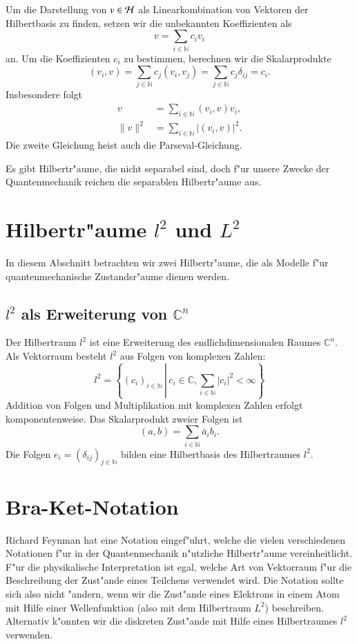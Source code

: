 Um die Darstellung von $v\in\cal H$ als Linearkombination von Vektoren
der Hilbertbasis zu finden, setzen wir die unbekannten Koeffizienten
als 
\[
v=\sum_{i\in\mathbb N}c_iv_i
\]
an. Um die Koeffizienten $c_i$ zu bestimmen, berechnen wir die
Skalarprodukte
\[
(v_i,v)
=\sum_{j\in\mathbb N} c_j(v_i,v_j)=\sum_{j\in\mathbb N}c_j\delta_{ij}=c_i.
\]
Insbesondere folgt
\begin{align*}
v&=\sum_{i\in\mathbb N}(v_i,v) v_i,\\
\| v\|^2&=\sum_{i\in\mathbb N} |(v_i,v)|^2.
\end{align*}
Die zweite Gleichung heist auch die Parseval-Gleichung.

Es gibt Hilbertr"aume, die nicht separabel sind, doch f"ur unsere Zwecke
der Quantenmechanik reichen die separablen Hilbertr"aume aus.

\section{Hilbertr"aume $l^2$ und $L^2$}
In diesem Abschnitt betrachten wir zwei Hilbertr"aume, die als 
Modelle f"ur quantenmechanische Zustandsr"aume dienen werden.

\subsection{$l^2$ als Erweiterung von $\mathbb C^n$}
Der Hilbertraum $l^2$ ist eine Erweiterung des endlichdimensionalen
Raumes $\mathbb C^n$. Als Vektorraum besteht $l^2$ aus Folgen von
komplexen Zahlen:
\[
l^2=\left\{
(c_i)_{i\in\mathbb N}\,\left|\,c_i\in\mathbb C,
\sum_{i\in\mathbb N} |c_i|^2 <\infty
\right.\right\}
\]
Addition von Folgen und Multiplikation mit komplexen Zahlen erfolgt 
komponentenweise. Das Skalarprodukt zweier Folgen ist
\[
(a, b)=\sum_{i\in\mathbb N} \bar a_i b_i.
\]
Die Folgen $e_i=(\delta_{ij})_{j\in\mathbb N}$ bilden eine Hilbertbasis
des Hilbertraumes $l^2$.

\section{Bra-Ket-Notation}
Richard Feynman hat eine Notation eingef"uhrt, welche die vielen verschiedenen
Notationen f"ur in der Quantenmechanik n"utzliche Hilbertr"aume
vereinheitlicht.
F"ur die physikalische Interpretation ist egal, welche Art von
Vektorraum f"ur die Beschreibung der Zust"ande eines Teilchens verwendet
wird.
Die Notation sollte sich also nicht "andern, wenn wir die Zust"ande eines
Elektrons in einem Atom mit Hilfe einer Wellenfunktion (also mit dem
Hilbertraum $L^2$) beschreiben. Alternativ k"onnten wir die diskreten
Zust"ande mit Hilfe eines Hilbertraumes $l^2$ verwenden.

